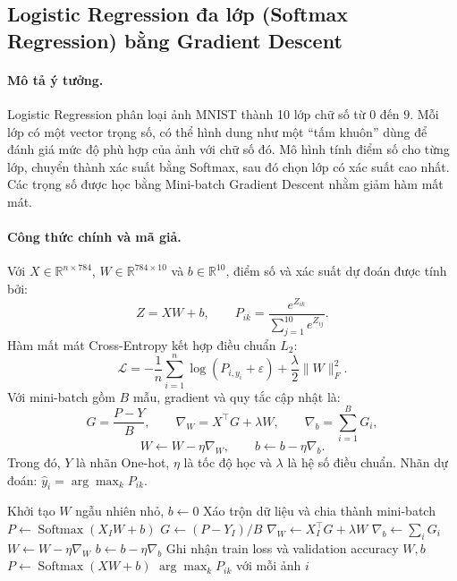 
\subsection{Logistic Regression đa lớp (Softmax Regression) bằng Gradient Descent}

\paragraph{Mô tả ý tưởng.}
Logistic Regression phân loại ảnh MNIST thành 10 lớp chữ số từ
$0$ đến $9$. Mỗi lớp có một vector trọng số, có thể hình dung như
một ``tấm khuôn'' dùng để đánh giá mức độ phù hợp của ảnh với chữ số đó.
Mô hình tính điểm số cho từng lớp, chuyển thành xác suất bằng Softmax,
sau đó chọn lớp có xác suất cao nhất. Các trọng số được học bằng
Mini-batch Gradient Descent nhằm giảm hàm mất mát.

\paragraph{Công thức chính và mã giả.}
Với $X\in\mathbb{R}^{n\times784}$,
$W\in\mathbb{R}^{784\times10}$ và $b\in\mathbb{R}^{10}$,
điểm số và xác suất dự đoán được tính bởi:
\[
Z=XW+b,\qquad
P_{ik}=\frac{e^{Z_{ik}}}{\sum_{j=1}^{10}e^{Z_{ij}}}.
\]
Hàm mất mát Cross-Entropy kết hợp điều chuẩn $L_2$:
\[
\mathcal{L}=-\frac{1}{n}\sum_{i=1}^{n}
\log(P_{i,y_i}+\varepsilon)
+\frac{\lambda}{2}\|W\|_F^2.
\]
Với mini-batch gồm $B$ mẫu, gradient và quy tắc cập nhật là:
\[
G=\frac{P-Y}{B},\qquad
\nabla_W=X^\top G+\lambda W,\qquad
\nabla_b=\sum_{i=1}^{B}G_i,
\]
\[
W\leftarrow W-\eta\nabla_W,\qquad
b\leftarrow b-\eta\nabla_b.
\]
Trong đó, $Y$ là nhãn One-hot, $\eta$ là tốc độ học và
$\lambda$ là hệ số điều chuẩn. Nhãn dự đoán:
$\hat y_i=\arg\max_k P_{ik}$.

\begin{algorithm}[H]
\caption{Huấn luyện và dự đoán Logistic Regression}
\label{alg:logistic}
\begin{algorithmic}[1]
    \State Khởi tạo $W$ ngẫu nhiên nhỏ, $b\gets 0$
        \State Xáo trộn dữ liệu và chia thành mini-batch
            \State $P\gets\operatorname{Softmax}(X_IW+b)$
            \State $G\gets(P-Y_I)/B$
            \State $\nabla_W\gets X_I^\top G+\lambda W$
            \State $\nabla_b\gets\sum_i G_i$
            \State $W\gets W-\eta\nabla_W$
            \State $b\gets b-\eta\nabla_b$
        \EndFor
        \State Ghi nhận train loss và validation accuracy
    \EndFor
    \State \Return $W,b$
\EndFunction
{}
    \State $P\gets\operatorname{Softmax}(XW+b)$
    \State \Return $\arg\max_k P_{ik}$ với mỗi ảnh $i$
\EndFunction
\end{algorithmic}
\end{algorithm}


